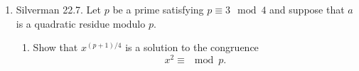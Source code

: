 \documentclass[10pt]{article}
\begin{document}
\begin{enumerate}[itemsep=1em,label=\Alph*.,leftmargin=*]
{\begin{minipage}{\dimexpr\linewidth-2\fboxrule-2\fboxsep}
\begin{proof}
\begin{align*}
                            \\&= \eq{-1}{p}^{\frac{p-1}{2}} \justify{"Fundamental formula", page $157$.}
                            \\&= \eq{-1}{p}^{2k+1}
                            \\&= \eq{(-1)^{2k+1}}{p}
                            \\&=\eq{-1}{p}.
                        \end{align*}
                        Hence, $2$ is a QR $\mod{p}$ if $p \equiv 1 \mod{8}$, and $2$ is a NR if $p \equiv 5 \mod{8}$.
                    \end{proof}
                \end{minipage}}


    \pagebreak
    \item Silverman 22.7. Let $p$ be a prime satisfying $p \equiv 3 \mod{4}$ and suppose that $a$ is a quadratic residue modulo $p$.
        \begin{enumerate}[label=(\alph*),leftmargin=*]
            \item Show that $x^{(p+1)/4}$ is a solution to the congruence
                \[x^2 \equiv  \mod{p}.\]


\end{enumerate}
\end{enumerate}
\end{document}
